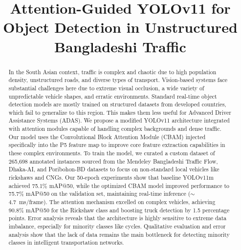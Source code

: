 \documentclass[sigconf]{acmart}
\begin{document}
\title{Attention-Guided YOLOv11 for Object Detection in Unstructured Bangladeshi Traffic}


\begin{abstract}
In the South Asian context, traffic is complex and chaotic due to high population density, unstructured roads, and diverse types of transport. Vision-based systems face substantial challenges here due to extreme visual occlusion, a wide variety of unpredictable vehicle shapes, and erratic environments. Standard real-time object detection models are mostly trained on structured datasets from developed countries, which fail to generalize to this region. This makes them less useful for Advanced Driver Assistance Systems (ADAS). We propose a modified YOLOv11 architecture integrated with attention modules capable of handling complex backgrounds and dense traffic. Our model uses the Convolutional Block Attention Module (CBAM) injected specifically into the P5 feature map to improve core feature extraction capabilities in these complex environments. To train the model, we curated a custom dataset of 265,698 annotated instances sourced from the Mendeley Bangladeshi Traffic Flow, Dhaka-AI, and Poribohon-BD datasets to focus on non-standard local vehicles like rickshaws and CNGs. Our 50-epoch experiments show that baseline YOLOv11m achieved 75.1\% mAP@50, while the optimized CBAM model improved performance to 75.7\% mAP@50 on the validation set, maintaining real-time inference ($\sim$4.7~ms/frame). The attention mechanism excelled on complex vehicles, achieving 90.8\% mAP@50 for the Rickshaw class and boosting truck detection by 1.5 percentage points. Error analysis reveals that the architecture is highly sensitive to extreme data imbalance, especially for minority classes like cycles. Qualitative evaluation and error analysis show that the lack of data remains the main bottleneck for detecting minority classes in intelligent transportation networks.
\end{abstract}
\end{document}
